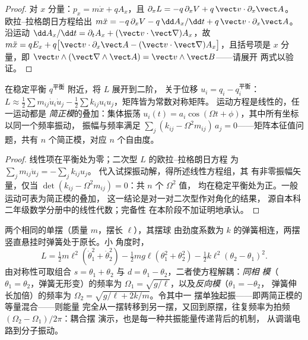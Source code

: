 \begin{proof}
对 $x$ 分量：$p_x = m\dot x + qA_x$，且
$\partial_xL = -q\,\partial_xV + q\,\vect v\cdot\partial_x\vect A$。
欧拉–拉格朗日方程给出 $m\ddot x = -q\,\partial_xV -
q\,\dd A_x/\dd t + q\,\vect v\cdot\partial_x\vect A$。沿运动
$\dd A_x/\dd t = \partial_tA_x + (\vect v\cdot\vect\nabla)A_x$，故
$m\ddot x = qE_x + q\big[\vect v\cdot\partial_x\vect A - (\vect v\cdot
\vect\nabla)A_x\big]$，且括号项是 $x$ 分量，即 $\vect
v\wedge(\vect\nabla\wedge\vect A) = \vect v\wedge\vect B$——请展开
两式以验证。
\end{proof}

\begin{proposition}[小振动与简正模]\label{prop:b3:lagrangian-mechanics:modes}
在稳定平衡 $q^{\text{平衡}}$ 附近，将 $L$ 展开到二阶，
关于位移 $u_i = q_i - q_i^{\text{平衡}}$：
$L \approx \tfrac12\sum m_{ij}\dot u_i\dot u_j -
\tfrac12\sum k_{ij}u_iu_j$，矩阵皆为常数对称矩阵。
运动方程是线性的，任一运动都是
\emph{简正模}的叠加：集体振荡 $u_i(t) = a_i\cos(\Omega t
+ \phi)$，其中所有坐标以同一个频率振动，
振幅与频率满足 $\sum_j(k_{ij} -
\Omega^2m_{ij})\,a_j = 0$——矩阵本征值问题，共有 $n$
个简正模，对应 $n$ 个自由度。
\end{proposition}

\begin{proof}
线性项在平衡处为零；二次型 $L$ 的欧拉–拉格朗日方程
为 $\sum_jm_{ij}\ddot u_j = -\sum_jk_{ij}u_j$。
代入试探振动解，得所述线性方程组，其
有非零振幅矢量，仅当 $\det(k_{ij} -
\Omega^2m_{ij}) = 0$：共 $n$ 个 $\Omega^2$ 值，
均在稳定平衡处为正。一般运动可表为简正模的叠加，
这一结论是对一对二次型作对角化的结果，
源自本科二年级数学分册中的线性代数；完备性
在本阶段不加证明地承认。
\end{proof}

\begin{example}[由弹簧耦合的两个单摆]\label{ex:b3:lagrangian-mechanics:coupled}
两个相同的单摆（质量 $m$，摆长 $\ell$），其摆球
由劲度系数为 $k$ 的弹簧相连，两摆竖直悬挂时弹簧处于原长。小
角度时，
\[
L = \tfrac12 m\ell^2(\dot\theta_1^2 + \dot\theta_2^2)
 - \tfrac12 mg\ell(\theta_1^2 + \theta_2^2)
 - \tfrac12 k\ell^2(\theta_2 - \theta_1)^2 .
\]
由对称性可取组合 $s = \theta_1 + \theta_2$ 与 $d =
\theta_1 - \theta_2$，二者使方程解耦：\emph{同相
模}（$\theta_1 = \theta_2$，弹簧无形变）的频率为 $\Omega_1 =
\sqrt{g/\ell}$，以及\emph{反向模}（$\theta_1 = -\theta_2$，
弹簧伸长加倍）的频率为 $\Omega_2 = \sqrt{g/\ell + 2k/m}$。令其中一
摆单独起振——即两简正模的等量混合——则能量
完全从一摆转移到另一摆，又回到原摆，往复频率为拍频
$(\Omega_2 - \Omega_1)/2\pi$：耦合摆
演示，也是每一种共振能量传递背后的机制，
从调谐电路到分子振动。
\end{example}

